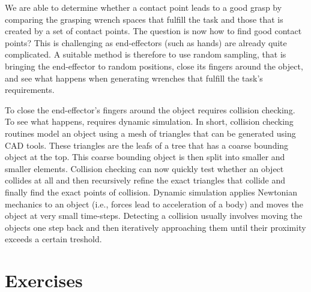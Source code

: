 We are able to determine whether a contact point leads to a good grasp by comparing the grasping wrench spaces that fulfill the task and those that is created by a set of contact points. The question is now how to find good contact points? This is challenging as end-effectors (such as hands) are already quite complicated. A suitable method is therefore to use random sampling, that is bringing the end-effector to random positions, close its fingers around the object, and see what happens when generating wrenches that fulfill the task's requirements.

To close the end-effector's fingers around the object requires collision checking. To see what happens, requires dynamic simulation. In short, collision checking routines model an object using a mesh of triangles that can be generated using CAD tools. These triangles are the leafs of a tree that has a coarse bounding object at the top. This coarse bounding object is then split into smaller and smaller elements. Collision checking can now quickly test whether an object collides at all and then recursively refine the exact triangles that collide and finally find the exact points of collision. Dynamic simulation applies Newtonian mechanics to an object (i.e., forces lead to acceleration of a body) and moves the object at very small time-steps. Detecting a collision usually involves moving the objects one step back and then iteratively approaching them until their proximity exceeds a certain treshold.

\section{Exercises}
